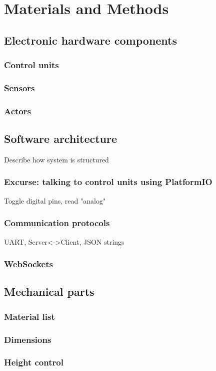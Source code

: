 \section{Materials and Methods}
\subsection{Electronic hardware components}
\subsubsection{Control units}
\subsubsection{Sensors}
\subsubsection{Actors}

\subsection{Software architecture}
Describe how system is structured
\subsubsection{Excurse: talking to control units using PlatformIO}
Toggle digital pins, read "analog"
\subsubsection{Communication protocols}
UART, Server<->Client, JSON strings
\subsubsection{WebSockets}


\subsection{Mechanical parts}
\subsubsection{Material list}
\subsubsection{Dimensions}
\subsubsection{Height control}